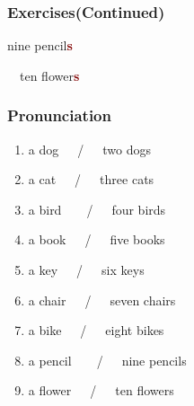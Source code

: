 \documentclass[aspectratio=169,xcolor={dvipsnames,table}]{beamer}
\newcommand{\myaudio}[1]{\href{#1}{\faVolumeUp}}
\begin{document}
\begin{frame}[plain]\frametitle{Exercises(Continued)}

\hspace{20pt}%
\pause
{}\hspace{15pt}
\pause

\mbox{}\hspace{.8\textwidth} {\large nine pencil\textcolor{Maroon}{\bfseries s}}
\pause

\bcfleur\,\,\,\,\hspace{45pt}%
\pause
\bcfleur\bcfleur\bcfleur\bcfleur\bcfleur\hspace{15pt}
\bcfleur\bcfleur\bcfleur\bcfleur\bcfleur\hspace{10pt}
\pause
{\large ten flower\textcolor{Maroon}{\bfseries s}}

\myaudio{./audio/005_singular_plural_03.mp3}
\end{frame}
\begin{frame}[plain]\frametitle{Pronunciation}

\begin{enumerate}
 \item a dog~~~/~~~two dogs%
\hfill{}\hspace{180pt}\mbox{}
 \item a cat~~~/~~~three cats%
\hfill{}\hspace{180pt}\mbox{}
 \item a bird~~~~/~~~four birds%
\hfill{}\hspace{180pt}\mbox{}
 \item a book~~~/~~~five books%
\hfill{}\hspace{180pt}\mbox{}
 \item a key~~~/~~~six keys%
\hfill{}\hspace{180pt}\mbox{}
 \item a chair~~~/~~~seven chairs%
\hfill{}\hspace{180pt}\mbox{}
 \item a bike~~~/~~~eight bikes%
\hfill{}\hspace{180pt}\mbox{}
 \item a pencil~~~~/~~~nine pencils%
\hfill{}\hspace{180pt}\mbox{}
 \item a flower~~~/~~~ten flowers%
\hfill{}\hspace{180pt}\mbox{}
\end{enumerate}



\mbox{}\hfill\myaudio{./audio/005_singular_plural_04.mp3}
\end{frame}
\end{document}
